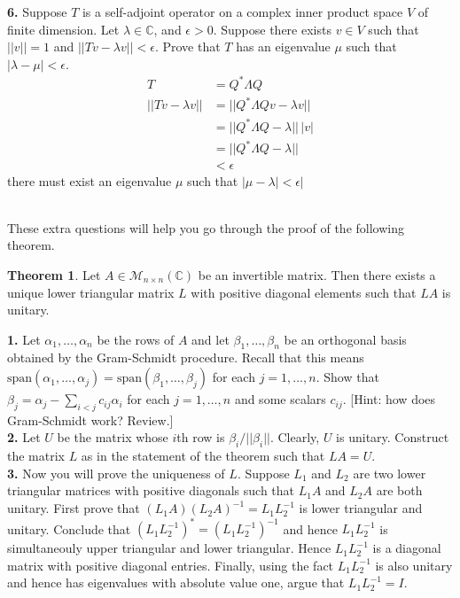 \documentclass[11pt]{amsart}
\theoremstyle{definition}  %
\newtheorem{theorem}{Theorem}
\newcommand{\C}{\mathbb{C}}
\begin{document}
\vskip 0.1cm 
\noindent 
{\bf 6.} Suppose $T$ is a self-adjoint operator on a complex inner product space $V$ of finite dimension. Let $\lambda \in \C$, and $\epsilon > 0$. Suppose
there exists $v \in V$ such that $|| v || = 1$ and $||Tv - \lambda v|| < \epsilon$. Prove that $T$ has an eigenvalue $\mu$ such that $|\lambda - \mu| < \epsilon$. \\
\begin{align*}
	T &= Q^*\Lambda Q\\
	||Tv-\lambda v||&= ||Q^*\Lambda Q v - \lambda v||\\
	&= ||Q^*\Lambda Q  - \lambda ||\, |v|\\
	&= ||Q^*\Lambda Q  - \lambda ||\\
	&< \epsilon
\end{align*}there must exist an eigenvalue $\mu$ such that $|\mu - \lambda| < \epsilon|$






\vfill
\eject
{}\\
These extra questions will help you go through the proof of the following theorem. \\
\begin{theorem} Let $A \in \mathcal{M}_{n \times n}(\C)$ be an invertible matrix. Then there exists a unique lower triangular matrix $L$ with positive diagonal elements such that $LA$ is unitary.
\end{theorem}

\vskip 0.2cm
\noindent
{\bf 1.} Let $\alpha_1, \ldots, \alpha_n$ be the rows of $A$ and let $\beta_1, \ldots, \beta_n$ be an orthogonal basis obtained by the Gram-Schmidt procedure. Recall that
this means $\mathrm{span}(\alpha_1, \ldots, \alpha_j) = \mathrm{span}(\beta_1, \ldots, \beta_j)$ for each $j=1, \ldots, n$. Show that $\beta_j = \alpha_j - \sum_{i < j} c_{ij} \alpha_i$
for each $j=1, \ldots, n$ and some scalars $c_{ij}$. [Hint: how does Gram-Schmidt work? Review.] \\


\vskip 0.1cm
\noindent 
{\bf 2.}  Let $U$ be the matrix whose $i$th row is $\beta_i/ ||\beta_i||$. Clearly, $U$ is unitary. Construct the matrix $L$ as in the statement of the theorem such that $LA = U$. \\

\vskip 0.1cm
\noindent 
{\bf 3.}  Now you will prove the uniqueness of $L$. Suppose $L_1$ and $L_2$ are two lower triangular matrices with positive diagonals such that $L_1A$ and $L_2A$ are both 
unitary. First prove that $(L_1A)(L_2A)^{-1} = L_1L_2^{-1}$ is lower triangular and unitary. Conclude that $(L_1L_2^{-1})^* = (L_1L_2^{-1})^{-1}$  and hence
$L_1L_2^{-1}$ is simultaneouly upper triangular and lower triangular.   Hence $L_1L_2^{-1}$ is a diagonal matrix with positive diagonal entries. Finally, using the fact
$L_1L_2^{-1}$ is also unitary and hence has  eigenvalues with absolute value one, argue that $L_1L_2^{-1} = I$. \\ 
\end{document}
